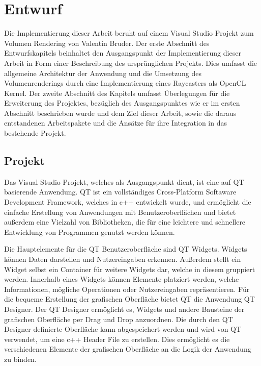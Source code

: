 \chapter{Entwurf}\label{chap::design}
Die Implementierung dieser Arbeit beruht auf einem Visual Studio Projekt zum Volumen Rendering von Valentin Bruder.
Der erste Abschnitt des Entwurfskapitels beinhaltet den Ausgangspunkt der Implementierung dieser Arbeit in Form einer Beschreibung des ursprünglichen Projekts.
Dies umfasst die allgemeine Architektur der Anwendung und die Umsetzung des Volumenrenderings durch eine Implementierung eines Raycasters als OpenCL Kernel.
Der zweite Abschnitt des Kapitels umfasst Überlegungen für die Erweiterung des Projektes, bezüglich des Ausgangspunktes wie er im ersten Abschnitt beschrieben wurde und dem Ziel dieser Arbeit, sowie die daraus entstandenen Arbeitspakete und die Ansätze für ihre Integration in das bestehende Projekt.

\section{Projekt}\label{sec::proj}
Das Visual Studio Projekt, welches als Ausgangspunkt dient, ist eine auf QT basierende Anwendung.
QT ist ein vollständiges Cross-Platform Softaware Development Framework, welches in c++ entwickelt wurde, und ermöglicht die einfache Erstellung von Anwendungen mit Benutzeroberflächen und bietet außerdem eine Vielzahl von Bibliotheken, die für eine leichtere und schnellere Entwicklung von Programmen genutzt werden können.

Die Hauptelemente für die QT Benutzeroberfläche sind QT Widgets.
Widgets können Daten darstellen und Nutzereingaben erkennen.
Außerdem stellt ein Widget selbst ein Container für weitere Widgets dar, welche in diesem gruppiert werden.
Innerhalb eines Widgets können Elemente platziert werden, welche Informationen, mögliche Operationen oder Nutzereingaben repräsentieren.
Für die bequeme Erstellung der grafischen Oberfläche bietet QT die Anwendung QT Designer.
Der QT Designer ermöglicht es, Widgets und andere Bausteine der grafischen Oberfläche per Drag und Drop anzuordnen.
Die durch den QT Designer definierte Oberfläche kann abgespeichert werden und wird von QT verwendet, um eine c++ Header File zu erstellen.
Dies ermöglicht es die verschiedenen Elemente der grafischen Oberfläche an die Logik der Anwendung zu binden.

